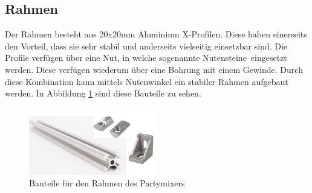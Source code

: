 \subsection{Rahmen}
\label{subsec:Rahmen}

Der Rahmen besteht aus 20x20mm Aluminium X-Profilen. Diese haben einerseits den Vorteil, dass sie sehr stabil und anderseits vielseitig einsetzbar sind. Die Profile verfügen über eine Nut, in welche sogenannte \flqq Nutensteine\frqq~eingesetzt werden. Diese verfügen wiederum über eine Bohrung mit einem Gewinde. Durch diese Kombination kann mittels Nutenwinkel ein stabiler Rahmen aufgebaut werden. In Abbildung \ref{fig:Rahmen} sind diese Bauteile zu sehen.  

\begin{figure}[H]
	\centering
	\includegraphics[width=0.5\textwidth]{graphics/Rahmen}
	\caption{Bauteile für den Rahmen des Partymixers \cite{cnccanen_store_us_nodate}\cite{lientec-led_nutenstein_nodate}\cite{led-glass_l-form_nodate}}
	\label{fig:Rahmen}
\end{figure}